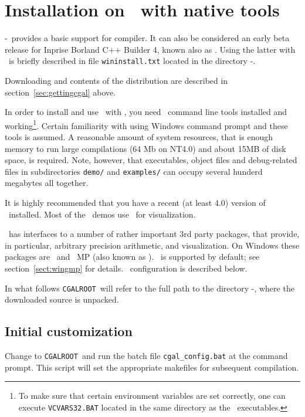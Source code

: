 \section{Installation on \mswin\ with native tools} \label{sec:wininst}
\cgal-\cgalrelease\ provides a basic support for 
compiler.  It can also be considered an early beta release for Inprise
Borland C++ Builder 4, known also as . 
Using the latter with \cgal\ is briefly described
in file \texttt{wininstall.txt} located in the directory
\cgal-\cgalrelease.

Downloading and contents of the distribution are described in 
section~\ref{sec:gettingcgal} above.

In order to install and use \cgal\ with \msvc , you need \msvc\ 
command line tools installed and working\footnote{To make sure that
  certain environment variables are set correctly, one can execute
  \texttt{VCVARS32.BAT} located in the same directory as the \msvc\ 
  executables.}. Certain familiarity with using Windows command prompt
and these tools is assumed. A reasonable amount of system resources,
that is enough memory to run large compilations (64 Mb on NT4.0) and
about 15MB of disk space, is required. Note, however, that 
executables, object files and debug-related files in subdirectories
\texttt{demo/} and \texttt{examples/} can occupy several hunderd
megabytes all together.

It is highly recommended that you have a recent (at least 4.0) version
of \leda\ installed. Most of the \cgal\ demos use \leda\ for
visualization.

\cgal\ has interfaces to a number of rather important 3rd party
packages, that provide, in particular, arbitrary precision arithmetic,
and visualization. On Windows these packages are \leda\ and \gnu\ MP
(also known as \gmp ).  \gmp\ is supported by default; see
section~\ref{sect:wingmp} for details.  \leda\ configuration is
described below.

\newcommand{\CGALR}{\texttt{CGALROOT}}
\newcommand{\bslsh}{$\backslash$}

In what follows \CGALR\ will refer to the full path to the
directory \cgal-\cgalrelease , where the downloaded source is
unpacked.

\subsection{Initial customization}

Change to \CGALR\ and run the batch file \texttt{cgal\_config.bat} at the
command prompt.  This script will set the appropriate makefiles for
subsequent compilation.

